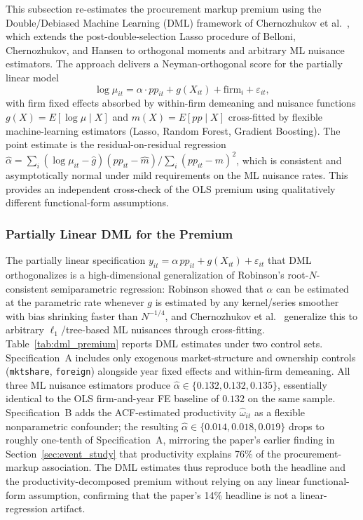 \documentclass[11pt]{article}
\begin{document}
This subsection re-estimates the procurement markup premium using the Double/Debiased Machine Learning (DML) framework of Chernozhukov et al.~\cite{ChernozhukovDML2018}, which extends the post-double-selection Lasso procedure of Belloni, Chernozhukov, and Hansen \cite{BCH2014JEP} to orthogonal moments and arbitrary ML nuisance estimators. The approach delivers a Neyman-orthogonal score for the partially linear model
\begin{equation}
\log \mu_{it} = \alpha \cdot pp_{it} + g(X_{it}) + \text{firm}_i + \varepsilon_{it},
\label{eq:dml_plr}
\end{equation}
with firm fixed effects absorbed by within-firm demeaning and nuisance functions $g(X) = E[\log \mu \mid X]$ and $m(X) = E[pp \mid X]$ cross-fitted by flexible machine-learning estimators (Lasso, Random Forest, Gradient Boosting). The point estimate is the residual-on-residual regression $\hat\alpha = \sum_i (\log\mu_{it} - \hat g)(pp_{it} - \hat m) / \sum_i (pp_{it} - \hat m)^2$, which is consistent and asymptotically normal under mild requirements on the ML nuisance rates. This provides an independent cross-check of the OLS premium using qualitatively different functional-form assumptions.

\subsubsection{Partially Linear DML for the Premium}\label{sec:dml_plr}

The partially linear specification $y_{it} = \alpha\, pp_{it} + g(X_{it}) + \varepsilon_{it}$ that DML orthogonalizes is a high-dimensional generalization of Robinson's \cite{Robinson1988} root-$N$-consistent semiparametric regression: Robinson showed that $\alpha$ can be estimated at the parametric rate whenever $g$ is estimated by any kernel/series smoother with bias shrinking faster than $N^{-1/4}$, and Chernozhukov et al.~\cite{ChernozhukovDML2018} generalize this to arbitrary $\ell_1$/tree-based ML nuisances through cross-fitting. Table~\ref{tab:dml_premium} reports DML estimates under two control sets. Specification~A includes only exogenous market-structure and ownership controls (\texttt{mktshare}, \texttt{foreign}) alongside year fixed effects and within-firm demeaning. All three ML nuisance estimators produce $\hat\alpha \in \{0.132, 0.132, 0.135\}$, essentially identical to the OLS firm-and-year FE baseline of $0.132$ on the same sample. Specification~B adds the ACF-estimated productivity $\hat\omega_{it}$ as a flexible nonparametric confounder; the resulting $\hat\alpha \in \{0.014, 0.018, 0.019\}$ drops to roughly one-tenth of Specification~A, mirroring the paper's earlier finding in Section~\ref{sec:event_study} that productivity explains 76\% of the procurement-markup association. The DML estimates thus reproduce both the headline and the productivity-decomposed premium without relying on any linear functional-form assumption, confirming that the paper's 14\% headline is not a linear-regression artifact.
\end{document}

